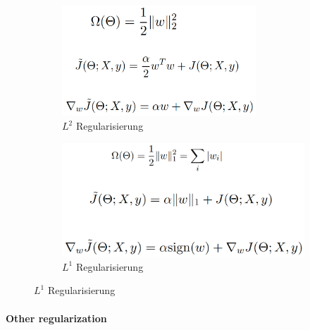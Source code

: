 \documentclass[a4paper]{article}
\begin{document}
		\begin{figure}[htb!]
			\centering
			\begin{subfigure}[b]{0.475\textwidth}
				\centering
				\includegraphics[width=0.8\textwidth]{img/06_deep_nn/l2_regularization.png}
				\caption{$L^2$ Regularisierung}
			\end{subfigure}
			\hfill
			\begin{subfigure}[b]{0.475\textwidth}
				\centering
				\includegraphics[width=\textwidth]{img/06_deep_nn/l1_regularization.png}
				\caption{$L^1$ Regularisierung}
			\end{subfigure}
		\end{figure}
	
		\newpage
	
		\paragraph{Other regularization}
		
\end{document}

